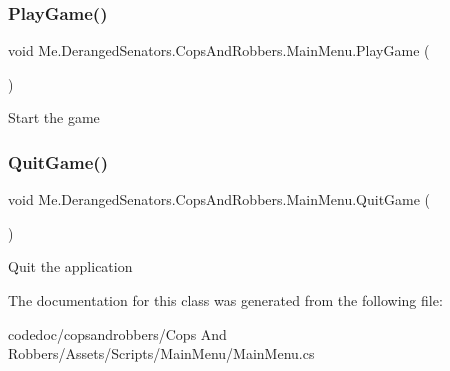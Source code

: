 \subsubsection{\texorpdfstring{Play\+Game()}{PlayGame()}}
{\footnotesize\ttfamily void Me.\+Deranged\+Senators.\+Cops\+And\+Robbers.\+Main\+Menu.\+Play\+Game (\begin{DoxyParamCaption}{ }\end{DoxyParamCaption})\hspace{0.3cm}{\ttfamily [inline]}}



Start the game 

\mbox{\label{classMe_1_1DerangedSenators_1_1CopsAndRobbers_1_1MainMenu_a672493dace11db28e9278cb19fd44821}} 
\subsubsection{\texorpdfstring{Quit\+Game()}{QuitGame()}}
{\footnotesize\ttfamily void Me.\+Deranged\+Senators.\+Cops\+And\+Robbers.\+Main\+Menu.\+Quit\+Game (\begin{DoxyParamCaption}{ }\end{DoxyParamCaption})\hspace{0.3cm}{\ttfamily [inline]}}



Quit the application 



The documentation for this class was generated from the following file\+:\begin{DoxyCompactItemize}
\item 
codedoc/copsandrobbers/\+Cops And Robbers/\+Assets/\+Scripts/\+Main\+Menu/Main\+Menu.\+cs\end{DoxyCompactItemize}
